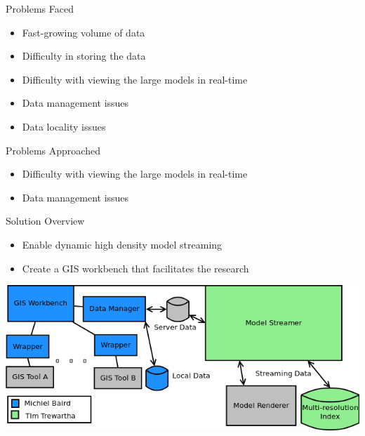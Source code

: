 \documentclass{beamer}
\begin{document}
\begin{frame}{Problems Faced}
\begin{itemize}
    \item Fast-growing volume of data
    \item Difficulty in storing the data
    \item Difficulty with viewing the large models in real-time
    \item Data management issues
    \item Data locality issues
\end{itemize}
\end{frame}


\begin{frame}{Problems Approached}
    \begin{itemize}
        \item Difficulty with viewing the large models in real-time
        \item Data management issues
    \end{itemize}
\end{frame}

\begin{frame}{Solution Overview}

\begin{itemize}
\item Enable dynamic high density model streaming
\item Create a GIS workbench that facilitates the research
    \end{itemize}
    \begin{center}
    \includegraphics[width=0.8\linewidth]{images/mainDiagram.png}
    \end{center}
\end{frame}
\end{document}
